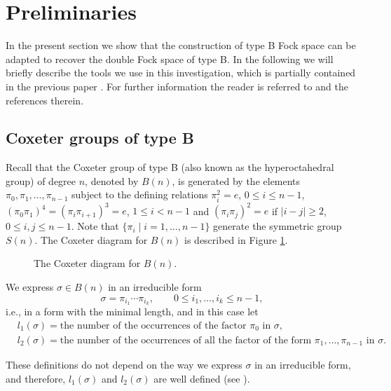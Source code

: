 \section{Preliminaries }
\label{sec:preliminaries}
In the present section we show that the construction of type B Fock space \cite{BozejkoEjsmontHasebe2015} can be adapted to recover the
double Fock space of type B.
In the following we will briefly describe the tools we use in this investigation,
which is partially contained in the previous paper \cite{BozejkoEjsmontHasebe2015}.
For further information the reader is referred to \cite{BozejkoEjsmontHasebe2015} and the references therein.

\subsection{Coxeter groups of type B}
Recall that the Coxeter
group of type B (also known as the hyperoctahedral group) of degree $n$, denoted by $B(n)$, is generated
by the elements $\pi_0, \pi_1, \dots , \pi_{n-1}$ subject to the defining relations $\pi_i^2=e$, $0\leq i \leq n-1$, $(\pi_0\pi_1)^4=(\pi_i \pi_{i+1})^3=e$, $1\leq i < n-1$ and $(\pi_i \pi_j)^2=e$ if $|i-j|\geq2$, $0\leq i,j\leq n-1$. Note that $\{\pi_i\mid i=1,\dots,n-1\}$ generate the symmetric group $S(n)$.
The Coxeter diagram for $B(n)$ is described in Figure \ref{fig:BN}.
\begin{figure}[htp]
\centering
		\caption{The Coxeter diagram for $B(n)$.}
		\label{fig:BN}
\end{figure}


We express $\sigma \in B(n)$ in an irreducible form
\[
\sigma=\pi_{i_1} \cdots \pi_{i_{k}}, \qquad 0\leq i_1,\dots,i_k \leq n-1,
\]
i.e., in a form with the minimal length, and in this case let
\begin{align*}
	&l_1(\sigma)= \text{the number of the occurrences of the factor $\pi_0$ in $\sigma$},
\\[1mm]
	&l_2(\sigma) = \text{the number of the occurrences of all the factor of the form $\pi_1,\dots,\pi_{n-1}$ in $\sigma$}.
\end{align*}

\begin{Remark}
These definitions do not depend on the way we express $\sigma$ in an irreducible form, and therefore, $l_1(\sigma)$ and $l_2(\sigma)$ are well defined (see \cite[Proposition~1]{BozejkoSzwarc2003}).
\end{Remark}
